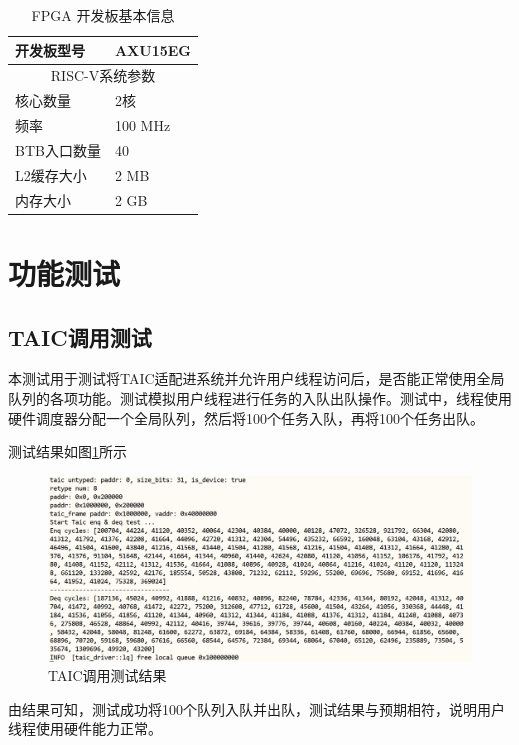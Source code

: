 \begin{table}[htbp]
\centering
\renewcommand{\arraystretch}{1.2}
\begin{tabular}{|l|l|}
\hline
\textbf{开发板型号} & AXU15EG \\
\hline
\multicolumn{2}{|c|}{RISC-V系统参数} \\
\hline
核心数量 & 2核 \\
\hline
频率 & 100 MHz \\
\hline
BTB入口数量 & 40 \\
\hline
L2缓存大小 & 2 MB \\
\hline
内存大小 & 2 GB \\
\hline
\end{tabular}
\caption{FPGA 开发板基本信息}
\label{tab:fpga-info}
\end{table}

\section{功能测试}

\subsection{TAIC调用测试}

本测试用于测试将TAIC适配进系统并允许用户线程访问后，是否能正常使用全局队列的各项功能。测试模拟用户线程进行任务的入队出队操作。测试中，线程使用硬件调度器分配一个全局队列，然后将100个任务入队，再将100个任务出队。

测试结果如图\ref{taictest}所示

\begin{figure}[htbp]
  \centering
  \includegraphics[width=\textwidth]{images/TAICtest.png}
  \caption{TAIC调用测试结果}\label{taictest}
\end{figure}

由结果可知，测试成功将100个队列入队并出队，测试结果与预期相符，说明用户线程使用硬件能力正常。

